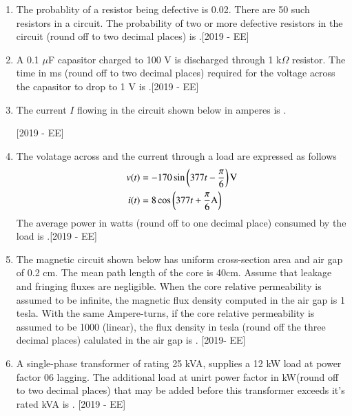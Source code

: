 \documentclass[journal]{IEEEtran}
\begin{document}
\begin{enumerate}
    \item The probablity of a resistor being defective is 0.02. There are 50 such resistors in a circuit. The probability of two or more defective resistors in the circuit (round off to two decimal places) is \underline{\hspace{3cm}}.\hfill{[2019 - EE]}
    \item A 0.1 $\mu$F capasitor charged to 100 V is discharged through  1 k$\Omega$ resistor. The time in ms (round off to two decimal places) required for the voltage across the capasitor to drop to 1 V is \underline{\hspace{3cm}}.\hfill{[2019 - EE]}
    \item The current $I$ flowing in the circuit shown below in amperes is \underline{\hspace{3cm}}.\hfill\\\strut\hfill{[2019 - EE]}\\
        \begin{center}
            
        \end{center}
    \item The volatage across and the current through a load are expressed as follows 
        \begin{align*}v(t) &= -170 \sin \left(377t - \frac{\pi}{6}\right)\text{V}\\i(t) &= 8\cos\left(377t+\frac{\pi}{6}\text{A}\right)\end{align*}
        The average power in watts (round off to one decimal place) consumed by the load is \underline{\hspace{3cm}}.\hfill{[2019 - EE]}
    \item The magnetic circuit shown below has uniform cross-section area and air gap of 0.2 cm. The mean path length of the core is 40cm. Assume that leakage and fringing fluxes are negligible. When the core relative permeability is assumed to be infinite, the magnetic flux density computed in the air gap is 1 tesla. With the same Ampere-turns, if the core relative permeability is assumed to be 1000 (linear), the flux density in tesla (round off the three decimal places) calulated in the air gap is \underline{\hspace{3cm}}. \hfill{[2019- EE]}
        \begin{center}
            
        \end{center}
\item A single-phase transformer of rating 25 kVA, supplies a 12 kW load at power factor 06 lagging. The additional load at unirt power factor in kW(round off to two decimal places) that may be added before this transformer exceeds it's rated kVA is \underline{\hspace{3cm}}. \hfill{[2019 - EE]}

\end{enumerate}
\end{document}
